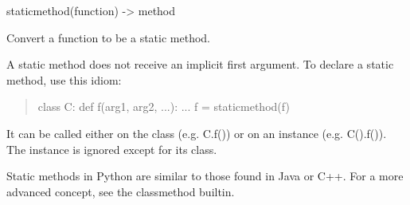 \documentclass[letterpaper,10pt,english]{sphinxmanual}
\begin{document}
\begin{fulllineitems}

\begin{fulllineitems}
\label{handler/handlers:RESThandlers.Playgrounds.Handler.PlaygroundHandler.get_item_count}
\end{fulllineitems}


\begin{fulllineitems}
\label{handler/handlers:RESThandlers.Playgrounds.Handler.PlaygroundHandler.get_near}
\end{fulllineitems}


\begin{fulllineitems}
\label{handler/handlers:RESThandlers.Playgrounds.Handler.PlaygroundHandler.get_within_rectangle}
\end{fulllineitems}


\begin{fulllineitems}
\label{handler/handlers:RESThandlers.Playgrounds.Handler.PlaygroundHandler.handler_id}
staticmethod(function) -\textgreater{} method

Convert a function to be a static method.

A static method does not receive an implicit first argument.
To declare a static method, use this idiom:
\begin{quote}

class C:
def f(arg1, arg2, ...): ...
f = staticmethod(f)
\end{quote}

It can be called either on the class (e.g. C.f()) or on an instance
(e.g. C().f()).  The instance is ignored except for its class.

Static methods in Python are similar to those found in Java or C++.
For a more advanced concept, see the classmethod builtin.


\end{fulllineitems}
\end{fulllineitems}
\end{document}
